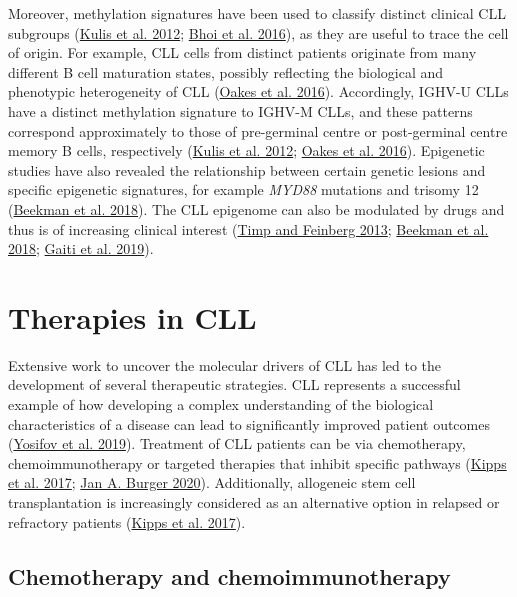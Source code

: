 \documentclass[11pt, a4paper, twosided]{book}
\begin{document}
Moreover, methylation signatures have been used to classify distinct clinical CLL subgroups (\protect\hyperlink{ref-Kulis2012}{Kulis et al. 2012}; \protect\hyperlink{ref-Bhoi2016}{Bhoi et al. 2016}), as they are useful to trace the cell of origin. For example, CLL cells from distinct patients originate from many different B cell maturation states, possibly reflecting the biological and phenotypic heterogeneity of CLL (\protect\hyperlink{ref-Oakes2016}{Oakes et al. 2016}). Accordingly, IGHV-U CLLs have a distinct methylation signature to IGHV-M CLLs, and these patterns correspond approximately to those of pre-germinal centre or post-germinal centre memory B cells, respectively (\protect\hyperlink{ref-Kulis2012}{Kulis et al. 2012}; \protect\hyperlink{ref-Oakes2016}{Oakes et al. 2016}). Epigenetic studies have also revealed the relationship between certain genetic lesions and specific epigenetic signatures, for example \emph{MYD88} mutations and trisomy 12 (\protect\hyperlink{ref-Beekman2018}{Beekman et al. 2018}). The CLL epigenome can also be modulated by drugs and thus is of increasing clinical interest (\protect\hyperlink{ref-Timp2013}{Timp and Feinberg 2013}; \protect\hyperlink{ref-Beekman2018}{Beekman et al. 2018}; \protect\hyperlink{ref-Gaiti2019}{Gaiti et al. 2019}).

\hypertarget{intro-therapies}{%
\section{Therapies in CLL}\label{intro-therapies}}

Extensive work to uncover the molecular drivers of CLL has led to the development of several therapeutic strategies. CLL represents a successful example of how developing a complex understanding of the biological characteristics of a disease can lead to significantly improved patient outcomes (\protect\hyperlink{ref-Yosifov2019}{Yosifov et al. 2019}).
Treatment of CLL patients can be via chemotherapy, chemoimmunotherapy or targeted therapies that inhibit specific pathways (\protect\hyperlink{ref-Kipps2017}{Kipps et al. 2017}; \protect\hyperlink{ref-Burger2020}{Jan A. Burger 2020}). Additionally, allogeneic stem cell transplantation is increasingly considered as an alternative option in relapsed or refractory patients (\protect\hyperlink{ref-Kipps2017}{Kipps et al. 2017}).

\hypertarget{intro-chemotherapy}{%
\subsection{Chemotherapy and chemoimmunotherapy}\label{intro-chemotherapy}}
\end{document}
